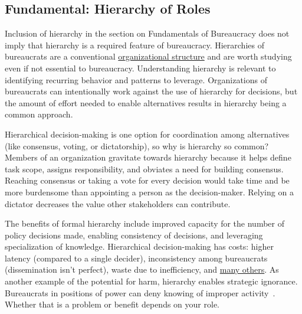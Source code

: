 \subsection*{Fundamental: Hierarchy of Roles\label{sec:hierarchy-of-roles}}

Inclusion of hierarchy in the section on Fundamentals of Bureaucracy does not imply that hierarchy is a required feature of bureaucracy. Hierarchies of bureaucrats are a conventional \href{https://en.wikipedia.org/wiki/Organizational_structure}{organizational structure}%
%
\iftoggle{WPinmargin}{\marginpar{$>$Wikipedia: Organizational structure}}{}%
and are worth studying even if not essential to bureaucracy. Understanding hierarchy is relevant to identifying recurring behavior and patterns to leverage.
Organizations of bureaucrats can intentionally work against the use of hierarchy for decisions, but the amount of effort needed to enable alternatives results in hierarchy being a common approach.


Hierarchical decision-making is one option for coordination among alternatives (like consensus, voting, or dictatorship), so why is hierarchy so common? Members of an organization gravitate towards hierarchy because it helps define task scope, assigns responsibility, and obviates a need for building consensus. Reaching consensus or taking a vote for every decision would take time and be more burdensome than appointing a person as the decision-maker. Relying on a dictator decreases the value other stakeholders can contribute. 


The benefits of formal hierarchy include improved capacity for the number of policy decisions made, enabling consistency of decisions, and leveraging specialization of knowledge. 
Hierarchical decision-making has costs: higher latency (compared to a single decider), inconsistency among bureaucrats (dissemination isn't perfect), waste due to inefficiency, and 
\hyperref[sec:unavoidable-hazards]{many others}.
%
As another example of the potential for harm, hierarchy enables strategic ignorance. Bureaucrats in positions of power can deny knowing of improper activity~\cite{2019_McGoey, 2012_McGoey}.  Whether that is a problem or benefit depends on your role. 

